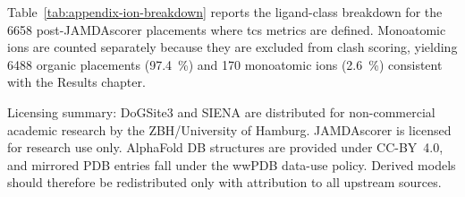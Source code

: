 Table~\ref{tab:appendix-ion-breakdown} reports the ligand-class breakdown for the \num{6658} post-JAMDAscorer placements where \gls{tcs} metrics are defined. Monoatomic ions are counted separately because they are excluded from clash scoring, yielding \num{6488} organic placements (\SI{97.4}{\percent}) and \num{170} monoatomic ions (\SI{2.6}{\percent}) consistent with the Results chapter.



Licensing summary: DoGSite3 and SIENA are distributed for non-commercial academic research by the ZBH/University of Hamburg. JAMDAscorer is licensed for research use only. AlphaFold DB structures are provided under CC-BY~4.0, and mirrored PDB entries fall under the wwPDB data-use policy. Derived models should therefore be redistributed only with attribution to all upstream sources.
